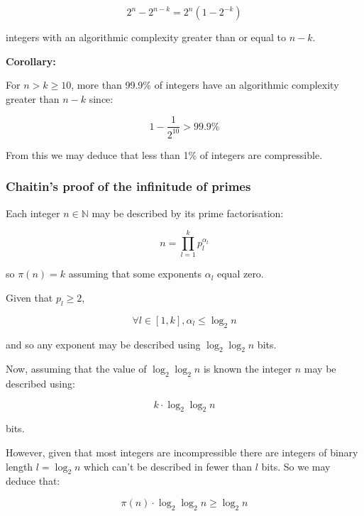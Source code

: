\documentclass{article}
\begin{document}
\begin{equation}
2^n - 2^{n-k} = 2^n(1-2^{-k})
\end{equation}

integers with an algorithmic complexity greater than or equal to $n-k$.

\textbf{Corollary:}

For $n > k \geq 10$, more than 99.9\% of integers have an algorithmic complexity greater than $n-k$
since:

\begin{equation}
1-\frac{1}{2^{10}} > 99.9\%
\end{equation}

From this we may deduce that less than 1\% of integers are compressible.

\subsubsection{Chaitin's proof of the infinitude of primes}

Each integer $n \in \mathbb{N}$ may be described by its prime factorisation:

\begin{equation}
n = \prod_{l=1}^k p_l^{\alpha_l}
\end{equation}

so $\pi(n)=k$ assuming that some exponents $\alpha_l$ equal zero.

Given that $p_l \geq 2$,

\begin{equation}
\forall l \in [1,k], \alpha_l \leq \log_2 n
\end{equation}

and so any exponent may be described using $\log_2 \log_2 n$ bits.

Now, assuming that the value of $\log_2 \log_2 n$ is known the integer $n$ may be described
using:

\begin{equation}
k \cdot \log_2 \log_2 n
\end{equation}

bits.

However, given that most integers are incompressible there are integers of binary length $l = \log_2 n$ which
can't be described in fewer than $l$ bits. So we may deduce that:

\begin{equation}
\pi(n) \cdot \log_2 \log_2 n \geq \log_2 n
\end{equation}
\end{document}
